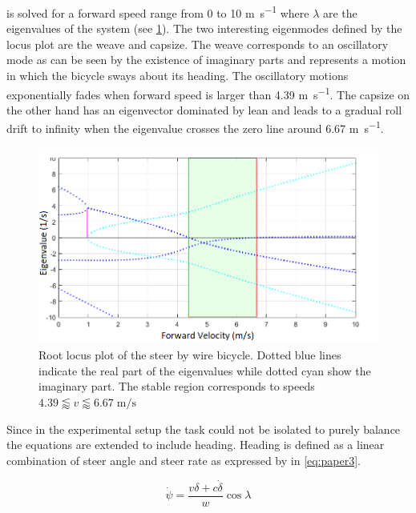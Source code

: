 is solved for a forward speed range from 0 to 10 \si{\meter\per\second} where \ensuremath{\lambda} are the eigenvalues of the system (see \cref{fig:paper2}). The two interesting eigenmodes defined by the locus plot are the weave and capsize. The weave corresponds to an oscillatory mode as can be seen by the existence of imaginary parts and represents a motion in which the bicycle sways about its heading. The oscillatory motions exponentially fades when forward speed is larger than 4.39 \si{\meter\per\second}. The capsize on the other hand has an eigenvector dominated by lean and leads to a gradual roll drift to infinity when the eigenvalue crosses the zero line around 6.67 \si{\meter\per\second}.
\begin{figure}[ht]
    \centering
    \captionsetup{justification=centering,margin=2cm}

    \includegraphics[scale=0.6]{images/root_locus_steerbywire.png}
    \caption{Root locus plot of the steer by wire bicycle. Dotted blue lines indicate the real part of the eigenvalues while dotted cyan show the imaginary part. The stable region corresponds to speeds  \ensuremath{4.39\lessapprox v \lessapprox 6.67\; \si{\meter\per\second}}}
    \label{fig:paper2}
\end{figure}
Since in the experimental setup the task could not be isolated to purely balance the equations are extended to include heading. Heading is defined as a linear combination of steer angle and steer rate as expressed by \citet{meijaard2007linearized} in \cref{eq:paper3}. 

\begin{equation}
    \dot{\psi}=\frac{v \delta+c \dot{\delta}}{w} \cos \lambda
    \label{eq:paper3}
    \end{equation}

